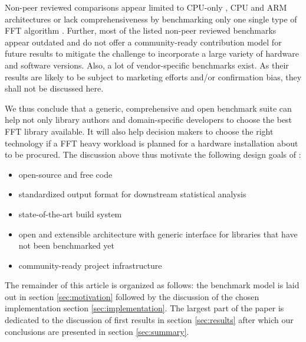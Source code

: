 Non-peer reviewed comparisons appear limited to CPU-only \citep{benchFFT}, CPU and ARM architectures \citep{roy_longbottom} or lack comprehensiveness by benchmarking only one single type of FFT algorithm \citep{fft_check}. Further, most of the listed non-peer reviewed benchmarks appear outdated and do not offer a community-ready contribution model for future results to mitigate the challenge to incorporate a large variety of hardware and software versions. Also, a lot of vendor-specific benchmarks exist. As their results are likely to be subject to marketing efforts and/or confirmation bias, they shall not be discussed here.

We thus conclude that a generic, comprehensive and open benchmark suite can help not only library authors and domain-specific developers to choose the best FFT library available. It will also help decision makers to choose the right technology if a FFT heavy workload is planned for a hardware installation about to be procured. The discussion above thus motivate the following design goals of \gearshifft{}:

\begin{itemize}
\item open-source and free code
\item standardized output format for downstream statistical analysis
\item state-of-the-art build system
\item open and extensible architecture with generic interface for libraries that have not been benchmarked yet
\item community-ready project infrastructure
\end{itemize}

The remainder of this article is organized as follows: the benchmark model is laid out in section \ref{sec:motivation} followed by the discussion of the chosen implementation section \ref{sec:implementation}. The largest part of the paper is dedicated to the discussion of first results in section \ref{sec:results} after which our conclusions are presented in section \ref{sec:summary}.



%
